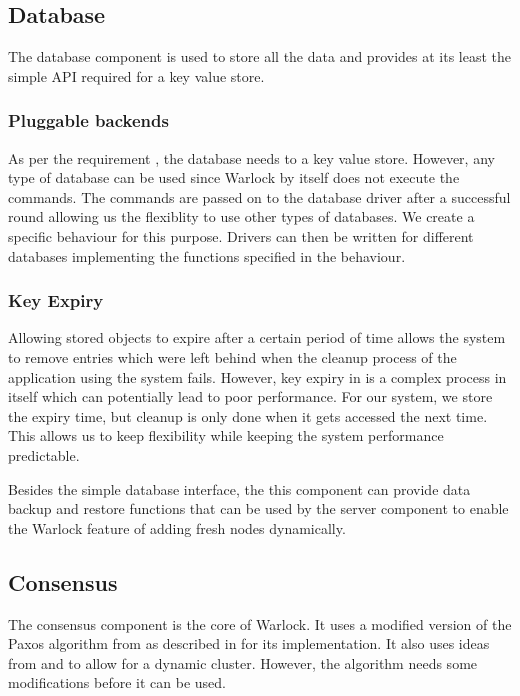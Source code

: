 \subsection{Database}

The database component is used to store all the data and provides at its
least the simple API required for a key value store.

\subsubsection{Pluggable backends}

As per the requirement , the database needs to a
key value store. However, any type of database can be used
since Warlock by itself does not execute the commands. The commands are passed
on to the database driver after a successful round allowing us the flexiblity
to use other types of databases. We create a specific behaviour%
for this purpose. Drivers can then be written for different databases
implementing the functions specified in the behaviour.

\subsubsection{Key Expiry}

Allowing stored objects to expire after a certain period of time allows the
system to remove entries which were left behind when the cleanup process
of the application using the system fails. However, key expiry in is a
complex process in itself  which can potentially lead to
poor performance. For our system, we store the expiry time, but cleanup is
only done when it gets accessed the next time. This allows us to keep
flexibility while keeping the system performance predictable.

Besides the simple database interface, the this component can provide data
backup and restore functions that can be used by the server component to
enable the Warlock feature of adding fresh nodes dynamically.

\subsection{Consensus}

The consensus component is the core of Warlock. It uses a modified version of
the Paxos algorithm from \citet{Robbert2011} as described in
 for its implementation. It also
uses ideas from \citet{LamportSP08} and \citet{LamportMZ10} to allow for
a dynamic cluster. However, the algorithm needs some modifications
 before it can be used.


